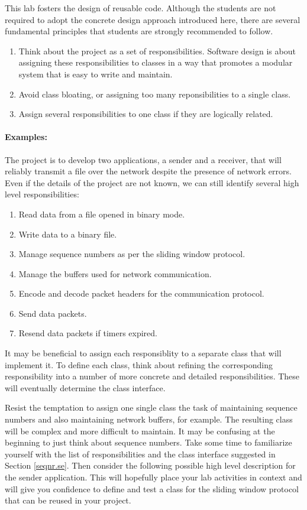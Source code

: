 \documentclass[12pt]{book}
\begin{document}
This lab fosters the design of reusable code. Although the students are not required to adopt the concrete design approach introduced here, there are several fundamental principles that students are strongly recommended to follow.

\begin{enumerate}[label= \arabic*.]
\item Think about the project as a set of responsibilities. Software design is about assigning these responsibilities to classes in a way that promotes a modular system that is easy to write and maintain.
\item Avoid class bloating, or assigning too many reponsibilities to a single class.
\item Assign several responsibilities to one class if they are logically related.
\end{enumerate}

\paragraph{Examples:}

The project is to develop two applications, a sender and a receiver, that will reliably transmit a file over the network despite the presence of network errors. Even if the details of the project are not known, we can still identify several high level responsibilities:

\begin{enumerate}
\item Read data from a file opened in binary mode.
\item Write data to a binary file.
\item Manage sequence numbers as per the sliding window protocol.
\item Manage the buffers used for network communication.
\item Encode and decode packet headers for the communication protocol.
\item Send data packets.
\item Resend data packets if timers expired.
\end{enumerate}

It may be beneficial to assign each responsiblity to a separate class that will implement it. 
To define each class, think about refining the corresponding responsibility into a number of more concrete and detailed responsibilities. These will eventually determine the class interface.

Resist the temptation to assign one single class the task of maintaining sequence numbers and also maintaining network buffers, for example. The resulting class will be complex and more difficult to maintain. It may be confusing at the beginning to just think about sequence numbers. Take some time to familiarize yourself with the list of responsibilities and the class interface suggested in Section \ref{seqnr.se}. Then consider the following possible high level description for the sender application. This will hopefully place your lab activities in context and will give you confidence to define and test a class for the sliding window protocol that can be reused in your project. 
\end{document}
